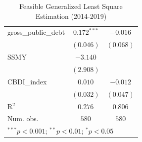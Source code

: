\begin{table} [h]
{{\begin{tabular}{l c c}
gross\_public\_debt & $0.172^{***}$  & $-0.016$     \\
                    & $(0.046)$      & $(0.068)$    \\
SSMY                & $-3.140$       &              \\
                    & $(2.908)$      &              \\
CBDI\_index         & $0.010$        & $-0.012$     \\
                    & $(0.032)$      & $(0.047)$    \\
\hline
R$^2$               & $0.276$        & $0.806$      \\
Num. obs.           & $580$          & $580$        \\
\hline
\multicolumn{3}{l}{\scriptsize{$^{***}p<0.001$; $^{**}p<0.01$; $^{*}p<0.05$}}
\end{tabular}}
}

\caption{Feasible Generalized Least Square Estimation (2014-2019)}
\label{FGLS}
\end{table}
